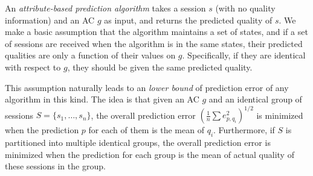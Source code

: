 




An {\it attribute-based prediction algorithm} takes a session $s$ (with no quality information) and an AC $g$ as input, and returns the predicted quality of $s$. We make a basic assumption that the algorithm maintains a set of states, and if a set of sessions are received when the algorithm is in the same states, their predicted qualities are only a function of their values on $g$. Specifically, if they are identical with respect to $g$, they should be given the same predicted quality. 

\label{subsec:lowerbound}
This assumption naturally leads to an {\it lower bound} of prediction error of any algorithm in this kind. 
The idea is that given an AC $g$ and an identical group of sessions $S=\{s_1,\dots,s_n\}$, the overall prediction error $\left(\frac{1}{n}\sum e_{p,q_i}^2\right)^{1/2}$ is minimized when the prediction $p$ for each of them is the mean of $q_i$. Furthermore, if $S$ is partitioned into multiple identical groups,  the overall prediction error is minimized when the prediction for each group is the mean of actual quality of these sessions in the group. 

